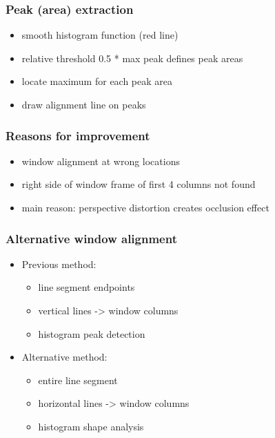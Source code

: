 \documentclass{beamer}
\begin{document}
\frame
{
	\frametitle{Peak (area) extraction}
	\begin{itemize}
	\item <+-| alert@+> smooth histogram function (red line) 
	\item <+-| alert@+> relative threshold 0.5 * max peak defines peak areas
	\item <+-| alert@+> locate maximum for each peak area
	\item <+-| alert@+> draw alignment line on peaks
	\end{itemize}
}


\frame
{
	\frametitle{Reasons for improvement}
	\begin{itemize}
	\item <+-| alert@+> window alignment at wrong locations
	\item <+-| alert@+> right side of window frame of first 4 columns not found
	\item <+-| alert@+> main reason: perspective distortion creates occlusion effect
	\end{itemize}
}

\frame
{
}

\frame
{
	\frametitle{Alternative window alignment}
	\begin{itemize}
	\item <+-| alert@+> Previous method: 
		\begin{itemize}
		\item <+-| alert@+> line segment endpoints
		\item <+-| alert@+> vertical lines -> window columns
		\item <+-| alert@+> histogram peak detection
		\end{itemize}
	\item <+-| alert@+> Alternative method: 
		\begin{itemize}
		\item <+-| alert@+> entire line segment
		\item <+-| alert@+> horizontal lines -> window columns
		\item <+-| alert@+> histogram shape analysis
		\end{itemize}
	\end{itemize}
}
\end{document}
